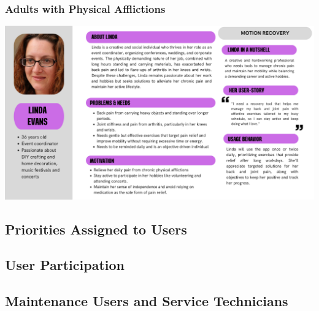    \subsubsection{Adults with Physical Afflictions}
    \includegraphics[width=\textwidth]{images/personas/patient_adult_physical_affliction.png}

\subsection{Priorities Assigned to Users}
\subsection{User Participation}
\subsection{Maintenance Users and Service Technicians}
